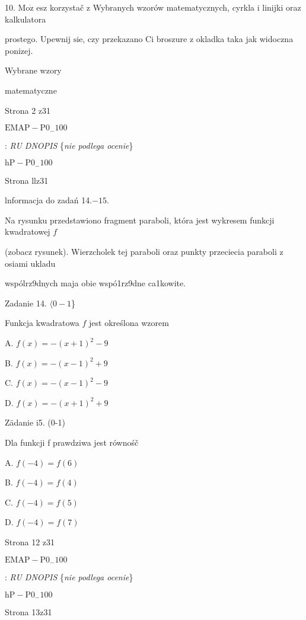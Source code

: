 \documentclass[a4paper,12pt]{article}
\begin{document}
10. $\mathrm{M}\mathrm{o}\dot{\mathrm{z}}$ esz korzystač z Wybranych wzorów matematycznych, cyrkla i linijki oraz kalkulatora

prostego. Upewnij $\mathrm{s}\mathrm{i}\mathrm{e}$, czy przekazano Ci broszure z okladka taka jak widoczna ponizej.

Wybrane wzory

matematyczne

Strona 2 z31

$\mathrm{E}\mathrm{M}\mathrm{A}\mathrm{P}-\mathrm{P}0_{-}100$





: {\it RU DNOPIS} \{{\it nie podlega ocenie}\}

$\mathrm{h}\mathrm{P}-\mathrm{P}0_{-}100$

Strona llz31





lnformacja do zadań 14.$-15.$

Na rysunku przedstawiono fragment paraboli, która jest wykresem funkcji kwadratowej $f$

(zobacz rysunek). Wierzcholek tej paraboli oraz punkty przeciecia paraboli z osiami ukladu

wspólrz9dnych maja obie wspó1rz9dne ca1kowite.

Zadanie 14. $\langle 0-1$\}

Funkcja kwadratowa $f$ jest określona wzorem

A. $f(x)=-(x+1)^{2}-9$

B. $f(x)=-(x-1)^{2}+9$

C. $f(x)=-(x-1)^{2}-9$

D. $f(x)=-(x+1)^{2}+9$

Zädanie i5. (0-1)

Dla funkcji f prawdziwa jest równośč

A. $f(-4)=f(6)$

B. $f(-4)=f(4)$

C. $f(-4)=f(5)$

D. $f(-4)=f(7)$

Strona 12 z31

$\mathrm{E}\mathrm{M}\mathrm{A}\mathrm{P}-\mathrm{P}0_{-}100$





: {\it RU DNOPIS} \{{\it nie podlega ocenie}\}

$\mathrm{h}\mathrm{P}-\mathrm{P}0_{-}100$

Strona 13z31
\end{document}
